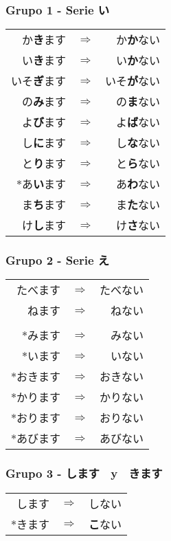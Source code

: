 \documentclass[a4paper,12pt,oneside]{report}
\def\then{$\Longrightarrow$}
\begin{document}
\begin{CJK*}{UTF8}{min}
        \subsubsection{Grupo 1 - Serie い}
        \begin{tabular}{rcr}
          か\textbf{き}ます & \then & か\textbf{か}ない \\
          い\textbf{き}ます & \then & い\textbf{か}ない \\
          いそ\textbf{ぎ}ます & \then & いそ\textbf{が}ない \\
          の\textbf{み}ます & \then & の\textbf{ま}ない \\
          よ\textbf{び}ます & \then & よ\textbf{ば}ない \\
          し\textbf{に}ます & \then & し\textbf{な}ない \\
          と\textbf{り}ます & \then & と\textbf{ら}ない \\
          $*$あ\textbf{い}ます & \then & あ\textbf{わ}ない \\
          ま\textbf{ち}ます & \then & ま\textbf{た}ない \\
          け\textbf{し}ます & \then & け\textbf{さ}ない \\
        \end{tabular}

        \subsubsection{Grupo 2 - Serie え}
        \begin{tabular}{rcr}
          たべます & \then & たべない \\
          ねます & \then & ねない \\
          &&\\
          $*$みます & \then & みない \\
          $*$います & \then & いない \\
          $*$おきます & \then & おきない \\
          $*$かります & \then & かりない \\
          $*$おります & \then & おりない \\
          $*$あびます & \then & あびない \\
        \end{tabular}

        \subsubsection{Grupo 3 - します　y　きます}
        \begin{tabular}{rcr}
          します    & \then & しない \\
          $*$きます & \then & \textbf{こ}ない \\
        \end{tabular}


\end{CJK*}
\end{document}
